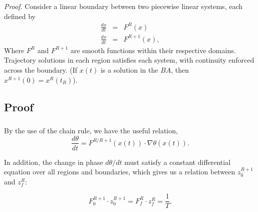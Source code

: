 \documentclass{beamer}
\begin{document}
\begin{frame}
\frametitle{\insertsection}
\framesubtitle{\insertsubsection}
\textit{Proof}. 
Consider a linear boundary between two piecewise linear systems, each defined by
\begin{eqnarray}
\frac{dx}{dt}&=&F^R(x)\\
\frac{dx}{dt}&=&F^{R+1}(x),
\end{eqnarray}
Where $F^R$ and $F^{R+1}$ are smooth functions within their respective domains.  Trajectory solutions in each region satisfies each system, with continuity enforced across the boundary. (If $x(t)$ is a solution in the $BA$, then $x^{R+1}(0) = x^R(t_R)$).
\end{frame}


\subsection{Proof}
\begin{frame}
\frametitle{\insertsection}
\framesubtitle{\insertsubsection}
By the use of the chain rule, we have the useful relation,
\begin{equation}
 \frac{d\theta}{dt}=F^{R/R+1}(x(t))\cdot\nabla\theta(x(t)).
\end{equation}

In addition, the change in phase $d\theta/dt$ must satisfy a constant differential equation over all regions and boundaries, which gives us a relation between $z_0^{R+1}$ and $z_f^{R}$:

\begin{equation}\label{eq:thetaflow}
F_0^{R+1}\cdot z_0^{R+1}=F_f^{R}\cdot z_f^{R}=\frac{1}{T}.
\end{equation}
\end{frame}


\end{document}
